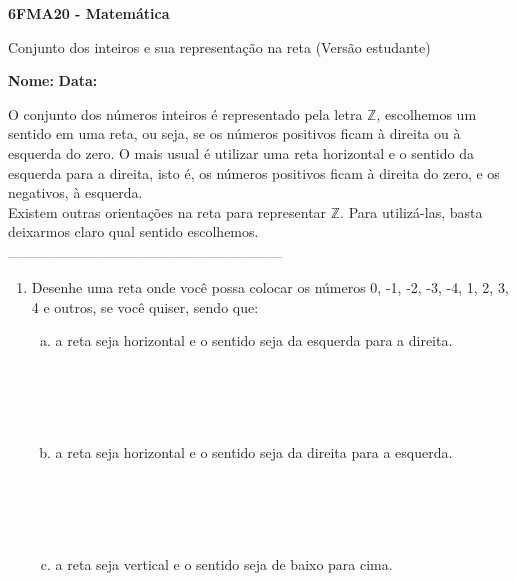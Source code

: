\documentclass[a4paper,14pt]{article}
\begin{document}
	
	\noindent\textbf{6FMA20 - Matemática} 
	
	\begin{center}Conjunto dos inteiros e sua representação na reta (Versão estudante)
	\end{center}
	
	\noindent\textbf{Nome:} \underline{\hspace{10cm}}
	\noindent\textbf{Data:} \underline{\hspace{4cm}}
	
	
	\begin{multicols}{2}
		\noindent O conjunto dos números inteiros é representado pela letra $\mathbb{Z}$, escolhemos um sentido em uma reta, ou seja, se os números positivos ficam à direita ou à esquerda do zero. O mais usual é utilizar uma reta horizontal e o sentido da esquerda para a direita, isto é, os números positivos ficam à direita do zero, e os negativos, à esquerda. \\
		Existem outras orientações na reta para representar $\mathbb{Z}$. Para utilizá-las, basta deixarmos claro qual sentido escolhemos. \\
		\noindent\textsubscript{-----------------------------------------------------------------------}
		\begin{enumerate} 
			\item Desenhe uma reta onde você possa colocar os números 0, -1, -2, -3, -4, 1, 2, 3, 4 e outros, se você quiser, sendo que:
			\begin{enumerate}[a)]
				\item a reta seja horizontal e o sentido seja da esquerda para a direita. \\\\\\\\\\
				\item a reta seja horizontal e o sentido seja da direita para a esquerda. \\\\\\\\\\
				\item a reta seja vertical e o sentido seja de baixo para cima. \\\\\\\\\\\\\\\\\\

\end{enumerate}
\end{enumerate}
\end{multicols}
\end{document}
